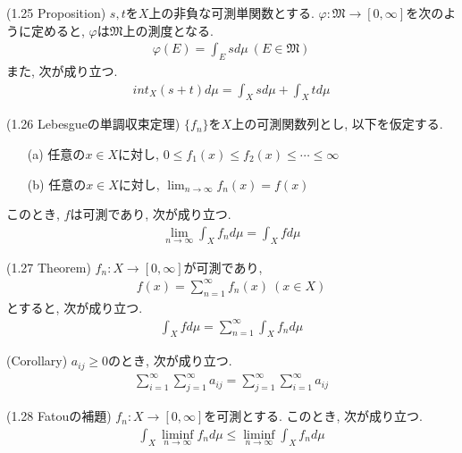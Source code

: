 \documentclass[a4paper]{jsarticle}
\begin{document}
\begin{prop}{(1.25 Proposition)}{}
    $s, t$を$X$上の非負な可測単関数とする. $\varphi: \mathfrak{M}\to [0, \infty]$を次のように定めると, $\varphi$は$\mathfrak{M}$上の測度となる.
    \begin{align*}
        \varphi(E) = \int_E s d\mu \ (E\in \mathfrak{M})
    \end{align*}
    また, 次が成り立つ.
    \begin{align*}
        int_X(s+t)d\mu = \int_X sd\mu + \int_X td\mu
    \end{align*}
\end{prop}

\begin{thm}{(1.26 Lebesgueの単調収束定理)}{}
    $\{f_n\}$を$X$上の可測関数列とし, 以下を仮定する.
    \begin{enumerate}
        \item[(a)] 任意の$x\in X$に対し, $0\leq f_1(x)\leq f_2(x)\leq \cdots\leq \infty$
        \item[(b)] 任意の$x\in X$に対し, $\lim_{n\to \infty} f_n(x) = f(x)$
    \end{enumerate}
    このとき, $f$は可測であり, 次が成り立つ.
    \begin{align*}
        \lim_{n\to \infty} \int_X f_n d\mu = \int_X fd\mu
    \end{align*}
\end{thm}

\begin{thm}{(1.27 Theorem)}{}
    $f_n:X\to [0, \infty]$が可測であり,
    \begin{align*}
        f(x) = \sum_{n=1}^\infty f_n(x) \ (x\in X)
    \end{align*}
    とすると, 次が成り立つ.
    \begin{align*}
        \int_X fd\mu = \sum_{n=1}^\infty \int_X f_nd\mu
    \end{align*}
\end{thm}
\begin{cor}{(Corollary)}{}
    $a_{ij}\geq 0$のとき, 次が成り立つ.
    \begin{align*}
        \sum_{i=1}^\infty \sum_{j=1}^\infty a_{ij} = \sum_{j=1}^\infty \sum_{i=1}^\infty a_{ij}
    \end{align*}
\end{cor}

\begin{thm}{(1.28 Fatouの補題)}{}
    $f_n:X\to [0,\infty]$を可測とする. このとき, 次が成り立つ.
    \begin{align*}
        \int_X \liminf_{n\to \infty} f_n d\mu \leq \liminf_{n\to \infty} \int_X f_n d\mu
    \end{align*}
\end{thm}
\end{document}
